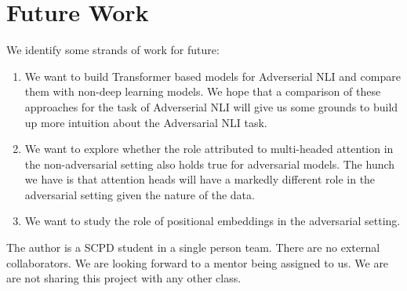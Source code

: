 \section{Future Work}
\label{sec:futurework}

We identify some strands of work for future:

\begin{enumerate}

\item
We want to build Transformer based models for Adverserial NLI and compare them with non-deep learning models. We hope that a comparison of these approaches for the task of Adverserial NLI will give us some grounds to build up more intuition about the Adversarial NLI task.
 
\item
We want to explore whether the role attributed to multi-headed attention in the non-adversarial setting also holds true for adversarial models. The hunch we have is that attention heads will have a markedly different role in the adversarial setting given the nature of the data.

\item
We want to study the role of positional embeddings in the adversarial setting. 

\end{enumerate}

The author is a SCPD student in a single person team. There are no external collaborators. We are looking forward to a mentor being assigned to us. We are are not sharing this project with any other class.